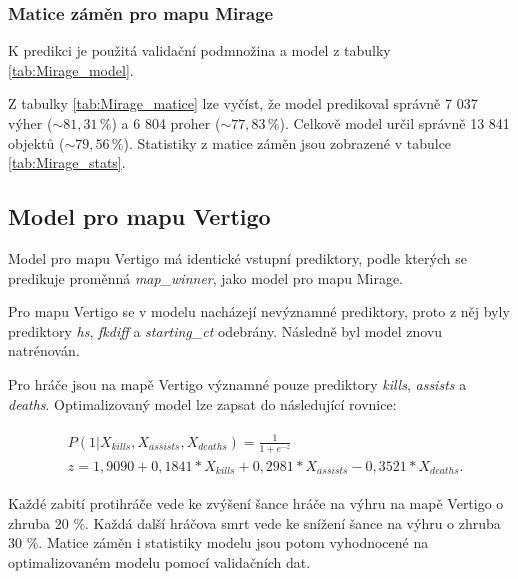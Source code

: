 \subsubsection{Matice záměn pro mapu Mirage}
K predikci je použitá validační podmnožina a model z tabulky \ref{tab:Mirage_model}.





Z tabulky \ref{tab:Mirage_matice} lze vyčíst, že model predikoval správně 7 037 výher ($\sim 81,31 \,\% $) a 6 804 proher ($\sim 77,83 \,\% $).
Celkově model určil správně 13 841 objektů ($\sim 79,56 \,\% $). Statistiky z matice záměn jsou zobrazené v tabulce \ref{tab:Mirage_stats}.

\newpage
\subsection{Model pro mapu Vertigo}
Model pro mapu Vertigo má identické vstupní prediktory, podle kterých se predikuje proměnná \textit{map\_winner}, jako model pro mapu Mirage.



Pro mapu Vertigo se v modelu nacházejí nevýznamné prediktory, proto z něj byly prediktory \textit{hs}, \textit{fkdiff} a \textit{starting\_ct} odebrány.
Následně byl model znovu natrénován.



Pro hráče jsou na mapě Vertigo významné pouze prediktory \textit{kills}, \textit{assists} a \textit{deaths}.
Optimalizovaný model lze zapsat do následující rovnice:

\begin{align}
    \begin{split}
        &P(1 | X_{kills}, X_{assists}, X_{deaths}) = \frac{1}{1 + e^{-z}} \\
        &z = 1,9090 + 0,1841*X_{kills} + 0,2981*X_{assists} - 0,3521*X_{deaths}.
    \end{split}
\end{align}

Každé zabití protihráče vede ke zvýšení šance hráče na výhru na mapě Vertigo o zhruba 20 \%. Každá další hráčova smrt vede ke snížení šance na výhru o zhruba 30 \%. 
Matice záměn i statistiky modelu jsou potom vyhodnocené na optimalizovaném modelu pomocí validačních dat.



